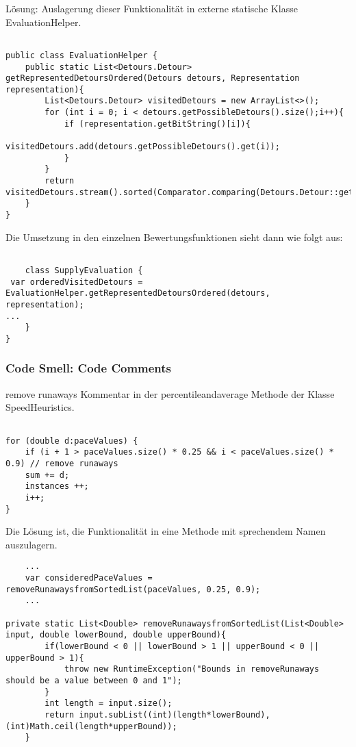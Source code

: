Lösung: Auslagerung dieser Funktionalität in externe statische Klasse EvaluationHelper.

\begin{lstlisting}

public class EvaluationHelper {
    public static List<Detours.Detour> getRepresentedDetoursOrdered(Detours detours, Representation representation){
        List<Detours.Detour> visitedDetours = new ArrayList<>();
        for (int i = 0; i < detours.getPossibleDetours().size();i++){
            if (representation.getBitString()[i]){
                visitedDetours.add(detours.getPossibleDetours().get(i));
            }
        }
        return visitedDetours.stream().sorted(Comparator.comparing(Detours.Detour::getPosition)).toList();
    }
}
\end{lstlisting}

Die Umsetzung in den einzelnen Bewertungsfunktionen sieht dann wie folgt aus:

\begin{lstlisting}

	class SupplyEvaluation {
 var orderedVisitedDetours = EvaluationHelper.getRepresentedDetoursOrdered(detours, representation);
...	
	}
}
\end{lstlisting}



\subsubsection{Code Smell: Code Comments}

remove runaways Kommentar in der percentileandaverage Methode der Klasse SpeedHeuristics.


\begin{lstlisting}

for (double d:paceValues) {
	if (i + 1 > paceValues.size() * 0.25 && i < paceValues.size() * 0.9) // remove runaways
	sum += d;
	instances ++;
	i++;
}
\end{lstlisting}

Die Lösung ist, die Funktionalität in eine Methode mit sprechendem Namen auszulagern.

\begin{lstlisting}
	...
	var consideredPaceValues = removeRunawaysfromSortedList(paceValues, 0.25, 0.9);
	...

private static List<Double> removeRunawaysfromSortedList(List<Double> input, double lowerBound, double upperBound){
        if(lowerBound < 0 || lowerBound > 1 || upperBound < 0 || upperBound > 1){
            throw new RuntimeException("Bounds in removeRunaways should be a value between 0 and 1");
        }
        int length = input.size();
        return input.subList((int)(length*lowerBound),(int)Math.ceil(length*upperBound));
    }

\end{lstlisting}

